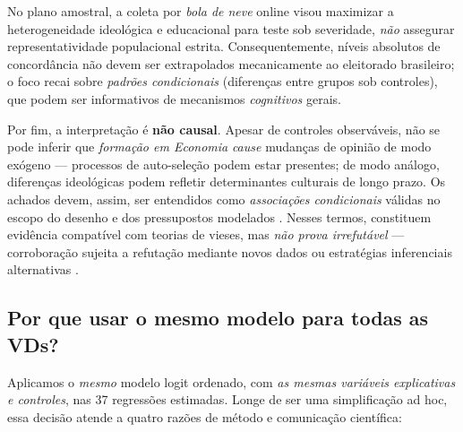 No plano amostral, a coleta por \textit{bola de neve} online visou maximizar a heterogeneidade ideológica e educacional para teste sob severidade, \textit{não} assegurar representatividade populacional estrita. Consequentemente, níveis absolutos de concordância não devem ser extrapolados mecanicamente ao eleitorado brasileiro; o foco recai sobre \textit{padrões condicionais} (diferenças entre grupos sob controles), que podem ser informativos de mecanismos \textit{cognitivos} gerais. 

Por fim, a interpretação é \textbf{não causal}. Apesar de controles observáveis, não se pode inferir que \textit{formação em Economia} \textit{cause} mudanças de opinião de modo exógeno — processos de auto-seleção podem estar presentes; de modo análogo, diferenças ideológicas podem refletir determinantes culturais de longo prazo. Os achados devem, assim, ser entendidos como \textit{associações condicionais} válidas no escopo do desenho e dos pressupostos modelados \cite{hausman2008}. Nesses termos, constituem evidência compatível com teorias de vieses, mas \textit{não prova irrefutável} — corroboração sujeita a refutação mediante novos dados ou estratégias inferenciais alternativas \cite{popperlogic}.

\subsection{Por que usar o mesmo modelo para todas as VDs?}\label{sec:modelo-unico}
Aplicamos o \emph{mesmo} modelo logit ordenado, com \emph{as mesmas variáveis explicativas e controles}, nas 37 regressões estimadas. Longe de ser uma simplificação ad hoc, essa decisão atende a quatro razões de método e comunicação científica:

